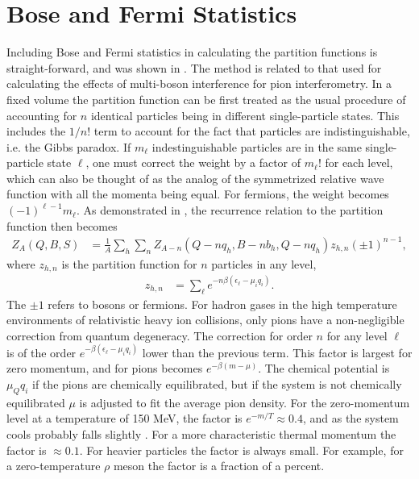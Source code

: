 
\section{Bose and Fermi Statistics}\label{sec:theorybosefermi}

Including Bose and Fermi statistics in calculating the partition functions is straight-forward, and was shown in \cite{}. The method is related to that used for calculating the effects of multi-boson interference for pion interferometry. In a fixed volume the partition function can be first treated as the usual procedure of accounting for $n$ identical particles being in different single-particle states. This includes the $1/n!$ term to account for the fact that particles are indistinguishable, i.e. the Gibbs paradox. If $m_\ell$ indestinguishable particles are in the same single-particle state $\ell$, one must correct the weight by a factor of $m_\ell!$ for each level, which can also be thought of as the analog of the symmetrized relative wave function with all the momenta being equal. For fermions, the weight becomes $(-1)^{\ell-1}m_\ell$. As demonstrated in \cite{}, the recurrence relation to the partition function then becomes
\begin{eqnarray}\label{eq:Zbf}
Z_{A}(Q,B,S)&=\frac{1}{A}\sum_h \sum_n Z_{A-n}(Q-nq_h,B-nb_h,Q-nq_h)z_{h,n}(\pm 1)^{n-1},
\end{eqnarray}
where $z_{h,n}$ is the partition function for $n$ particles in any level, 
\begin{eqnarray}
z_{h,n}&=\sum_\ell e^{-n\beta(\epsilon_\ell-\mu_iq_i)}.
\end{eqnarray}
The $\pm 1$ refers to bosons or fermions. For hadron gases in the high temperature environments of relativistic heavy ion collisions, only pions have a non-negligible correction from quantum degeneracy. The correction for order $n$ for any level $\ell$ is of the order $e^{-\beta(\epsilon_\ell-\mu_iq_i)}$ lower than the previous term. This factor is largest for zero momentum, and for pions becomes $e^{-\beta(m-\mu)}$. The chemical potential is $\mu_Q q_i$ if the pions are chemically equilibrated, but if the system is not chemically equilibrated $\mu$ is adjusted to fit the average pion density. For the zero-momentum level at a temperature of 150 MeV, the factor is $e^{-m/T}\approx 0.4$, and as the system cools probably falls slightly \cite{gong}. For a more characteristic thermal momentum the factor is $\approx 0.1$. For heavier particles the factor is always small. For example, for a zero-temperature $\rho$ meson the factor is a fraction of a percent.


